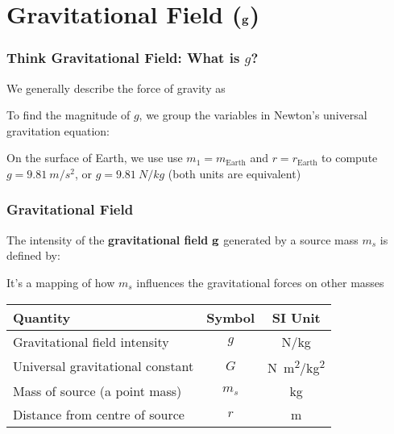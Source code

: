 \documentclass[12pt,compress,aspectratio=169]{beamer}
\newcommand{\mb}[1]{\ensuremath\mathbf{#1}}
\begin{document}
\section[$\mb{g}$]{Gravitational Field ($\mb{g}$)}


\begin{frame}
  \frametitle{Think Gravitational Field: What is $g$?}

  We generally describe the force of gravity as
  
  \vspace{-.25in}{\Large
    \begin{displaymath}
      \mb{F}_g=m\mb{g}
    \end{displaymath}
  }

  \vspace{-.2in}
  To find the magnitude of $g$, we group the variables in Newton's
  universal gravitation equation:
    

  \vspace{-.1in}
  On the surface of Earth, we use use $m_1=m_\mathrm{Earth}$ and
  $r=r_\mathrm{Earth}$ to compute $g=\SI{9.81}{m/s^2}$, or $g=\SI{9.81}{N/kg}$
  (both units are  equivalent)
\end{frame}

\begin{frame}
  \frametitle{Gravitational Field}
  The intensity of the \textbf{gravitational field} $\mb{g}$ generated by
  a source mass $m_s$ is defined by:

  
  It's a mapping of how $m_s$ influences the gravitational forces on other
  masses

  \begin{center}
    \begin{tabular}{l|c|c}
      \rowcolor{pink}
      \textbf{Quantity} & \textbf{Symbol} & \textbf{SI Unit} \\ \hline
      Gravitational field intensity    & $g$   & \si{N/kg}\\
      Universal gravitational constant & $G$   & \si{N.m^2/kg^2} \\
      Mass of source (a point mass)    & $m_s$ & \si{kg} \\
      Distance from centre of source   & $r$   & \si{m} \\
    \end{tabular}
  \end{center}
\end{frame}
\end{document}
